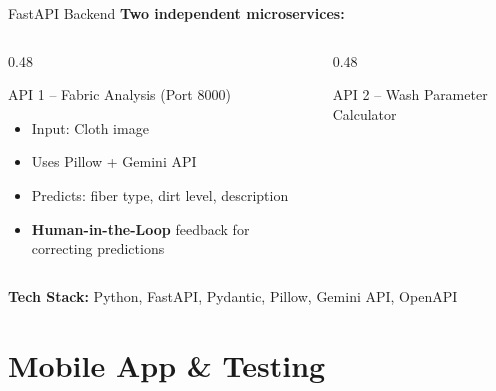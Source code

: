 \documentclass[aspectratio=169]{beamer}
\begin{document}
\begin{frame}{FastAPI Backend}
\textbf{Two independent microservices:}

\vspace{0.2cm}
\begin{columns}[T]
\begin{column}{0.48\textwidth}
\begin{block}{API 1 – Fabric Analysis (Port 8000)}
\small
\begin{itemize}
    \item Input: Cloth image
    \item Uses Pillow + Gemini API
    \item Predicts: fiber type, dirt level, description
    \item \textbf{Human-in-the-Loop} feedback for correcting predictions
\end{itemize}
\end{block}
\end{column}
\begin{column}{0.48\textwidth}
\begin{block}{API 2 – Wash Parameter Calculator}
\small

\end{block}
\end{column}
\end{columns}

\vspace{0.2cm}
\textbf{Tech Stack:} Python, FastAPI, Pydantic, Pillow, Gemini API, OpenAPI
\end{frame}

\section{Mobile App \& Testing}
\end{document}
